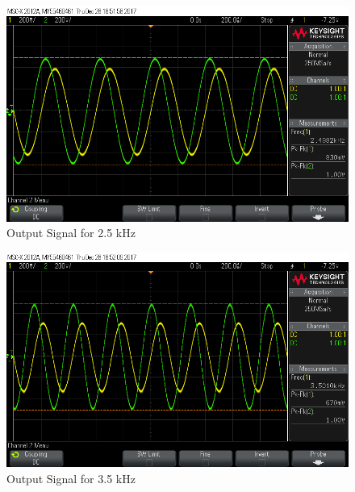 \documentclass[paper]{IEEEtran}
\begin{document}
\begin{figure}[h!]
	\setlength{\unitlength}{\textwidth}
	\center 
	\includegraphics[width=0.45\unitlength]{lpf_osc4.png}
	\caption{\label{fig:lpfvo2}Output Signal for 2.5 kHz}
\end{figure} 
	

\begin{figure}[h!]
	\setlength{\unitlength}{\textwidth}
	\center 
	\includegraphics[width=0.45\unitlength]{lpf_osc5.png}
	\caption{\label{fig:lpfvo2}Output Signal for 3.5 kHz}
\end{figure} 
		
\end{document}
